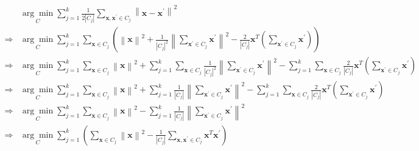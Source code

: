 \documentclass[a4paper]{article}
\begin{document}
\begin{enumerate}
\begin{enumerate}
\begin{enumerate}
    \begin{equation*}
      \begin{aligned}
        &\underset{C}{\arg \min } \sum_{j=1}^{k} \frac{1}{2\left|C_{j}\right|} \sum_{\boldsymbol{x}, \boldsymbol{x}^{\prime} \in C_{j}}\left\|\boldsymbol{x}-\boldsymbol{x}^{\prime}\right\|^{2}\\
        \Rightarrow & \underset{C}{\arg \min } \sum_{j=1}^{k} \sum_{\boldsymbol{x} \in C_{j}} (\left\|\boldsymbol{x}\right\|^{2} + \frac{1}{\left|C_{j}\right|^{2}}\left\|\sum_{\boldsymbol{x^{'}} \in C_{j}} \boldsymbol{x^{'}}\right\|^{2} - \frac{2}{\left|C_{j}\right|} \boldsymbol{x}^{T} (\sum_{\boldsymbol{x^{'}} \in C_{j}} \boldsymbol{x^{'}}))\\
        \Rightarrow & \underset{C}{\arg \min } \sum_{j=1}^{k} \sum_{\boldsymbol{x} \in C_{j}}\left\|\boldsymbol{x}\right\|^{2} + \sum_{j=1}^{k} \sum_{\boldsymbol{x} \in C_{j}}\frac{1}{\left|C_{j}\right|^{2}}\left\|\sum_{\boldsymbol{x^{'}} \in C_{j}} \boldsymbol{x^{'}}\right\|^{2} - \sum_{j=1}^{k} \sum_{\boldsymbol{x} \in C_{j}}\frac{2}{\left|C_{j}\right|} \boldsymbol{x}^{T} (\sum_{\boldsymbol{x^{'}} \in C_{j}} \boldsymbol{x^{'}})\\
        \Rightarrow & \underset{C}{\arg \min } \sum_{j=1}^{k} \sum_{\boldsymbol{x} \in C_{j}}\left\|\boldsymbol{x}\right\|^{2} + \sum_{j=1}^{k} \frac{1}{\left|C_{j}\right|}\left\|\sum_{\boldsymbol{x^{'}} \in C_{j}} \boldsymbol{x^{'}}\right\|^{2} - \sum_{j=1}^{k} \sum_{\boldsymbol{x} \in C_{j}}\frac{2}{\left|C_{j}\right|} \boldsymbol{x}^{T} (\sum_{\boldsymbol{x^{'}} \in C_{j}} \boldsymbol{x^{'}})\\
        \Rightarrow & \underset{C}{\arg \min } \sum_{j=1}^{k} \sum_{\boldsymbol{x} \in C_{j}}\left\|\boldsymbol{x}\right\|^{2} - \sum_{j=1}^{k} \frac{1}{\left|C_{j}\right|}\left\|\sum_{\boldsymbol{x^{'}} \in C_{j}} \boldsymbol{x^{'}}\right\|^{2}\\
        \Rightarrow & \underset{C}{\arg \min } \sum_{j=1}^{k} (\sum_{\boldsymbol{x} \in C_{j}}\left\|\boldsymbol{x}\right\|^{2} - \frac{1}{\left|C_{j}\right|} \sum_{\boldsymbol{x}, \boldsymbol{x}^{\prime} \in C_{j}} \boldsymbol{x}^{T} \boldsymbol{x}^{'})\\
      \end{aligned}
    \end{equation*}
    

\end{enumerate}
\end{enumerate}
\end{enumerate}
\end{document}
